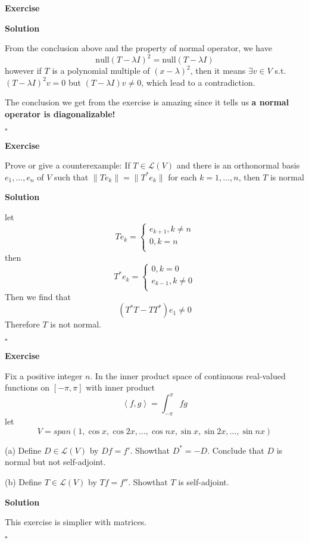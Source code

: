 \documentclass{article}
\newenvironment{exercise}{%
{\textbf{Exercise\\}
    }
}{
}
\newenvironment{solution}{%
{
    \textbf{Solution\\}
    }
}{
  \hfill $\square$ 
  \par\bigskip 
}
\newcommand{\n}{\text{null}}
\begin{document}
\begin{CJK}{UTF8}{gkai}
\begin{exercise}
\end{exercise}

\begin{solution}
    From the conclusion above and the property of normal operator, we have 
    \[\n (T - \lambda I)^2 = \n (T - \lambda I)\]
    however if $T$ is a polynomial multiple of $(x - \lambda)^2$, then it means $\exists v \in V$ s.t. $(T - \lambda I)^2 v = 0$ but $(T - \lambda I) v \neq 0$, which lead to a contradiction.

    The conclusion we get from the exercise is amazing since it tells us \textbf{a normal operator is diagonalizable!}
\end{solution}

\begin{exercise}
    Prove or give a counterexample: If $T \in \mathcal{L}(V)$ and there is an orthonormal basis $e_1, \ldots,e_n$ of $V$ such that $\|Te_k\| = \|T^\ast e_k\|$ for each $k = 1,\ldots,n$, then $T$ is normal
\end{exercise}

\begin{solution}
    let 
    \[T e_k =
    \begin{cases}
        e_{k + 1} , k \neq n\\
        0 , k = n\\
    \end{cases} \]
    then 
    \[T^\ast e_k = \begin{cases}
        0, k = 0\\
        e_{k - 1}, k \neq 0\\
    \end{cases}\]
    Then we find that 
    \[(T^\ast T - T T^\ast) e_1 \neq 0\]
    Therefore $T$ is not normal.
\end{solution}

\begin{exercise}
    Fix a positive integer $n$. In the inner product space of continuous real-valued functions on $[-\pi,\pi]$ with inner product 
    \[\left<f,g\right> = \int_{-\pi}^{\pi} fg\]
    let 
    \[V = span(1,\cos x,\cos 2x,\ldots,\cos nx,\sin x,\sin 2x,\ldots,\sin nx)\]
  
    (a) Define $D \in\mathcal{L}(V)$ by $Df = f'$. Showthat $D^\ast  = -D$. Conclude that $D$ is normal but not self-adjoint.

    (b) Define $T \in \mathcal{L}(V)$ by $Tf = f''$. Showthat $T$ is self-adjoint.
\end{exercise}

\begin{solution}
    This exercise is simplier with matrices.


\end{solution}
\end{CJK}
\end{document}

